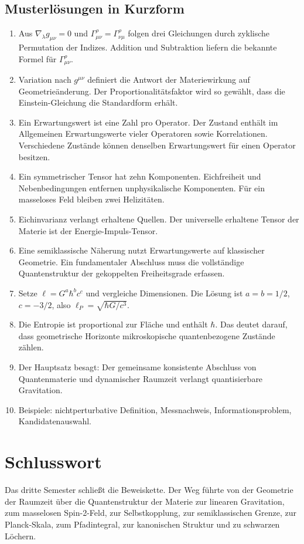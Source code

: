 \documentclass[11pt,a4paper]{book}
\theoremstyle{remark}
\begin{document}
\section*{Musterlösungen in Kurzform}
\begin{enumerate}
\item Aus $\nabla_\lambda g_{\mu\nu}=0$ und $\Gamma^\rho_{\mu\nu}=\Gamma^\rho_{\nu\mu}$ folgen drei Gleichungen durch zyklische Permutation der Indizes. Addition und Subtraktion liefern die bekannte Formel für $\Gamma^\rho_{\mu\nu}$.
\item Variation nach $g^{\mu\nu}$ definiert die Antwort der Materiewirkung auf Geometrieänderung. Der Proportionalitätsfaktor wird so gewählt, dass die Einstein-Gleichung die Standardform erhält.
\item Ein Erwartungswert ist eine Zahl pro Operator. Der Zustand enthält im Allgemeinen Erwartungswerte vieler Operatoren sowie Korrelationen. Verschiedene Zustände können denselben Erwartungswert für einen Operator besitzen.
\item Ein symmetrischer Tensor hat zehn Komponenten. Eichfreiheit und Nebenbedingungen entfernen unphysikalische Komponenten. Für ein masseloses Feld bleiben zwei Helizitäten.
\item Eichinvarianz verlangt erhaltene Quellen. Der universelle erhaltene Tensor der Materie ist der Energie-Impuls-Tensor.
\item Eine semiklassische Näherung nutzt Erwartungswerte auf klassischer Geometrie. Ein fundamentaler Abschluss muss die vollständige Quantenstruktur der gekoppelten Freiheitsgrade erfassen.
\item Setze $\ell=G^a\hbar^b c^c$ und vergleiche Dimensionen. Die Lösung ist $a=b=1/2$, $c=-3/2$, also $\ell_P=\sqrt{\hbar G/c^3}$.
\item Die Entropie ist proportional zur Fläche und enthält $\hbar$. Das deutet darauf, dass geometrische Horizonte mikroskopische quantenbezogene Zustände zählen.
\item Der Hauptsatz besagt: Der gemeinsame konsistente Abschluss von Quantenmaterie und dynamischer Raumzeit verlangt quantisierbare Gravitation.
\item Beispiele: nichtperturbative Definition, Messnachweis, Informationsproblem, Kandidatenauswahl.
\end{enumerate}

\chapter*{Schlusswort}
Das dritte Semester schließt die Beweiskette. Der Weg führte von der Geometrie der Raumzeit über die Quantenstruktur der Materie zur linearen Gravitation, zum masselosen Spin-2-Feld, zur Selbstkopplung, zur semiklassischen Grenze, zur Planck-Skala, zum Pfadintegral, zur kanonischen Struktur und zu schwarzen Löchern.
\end{document}
